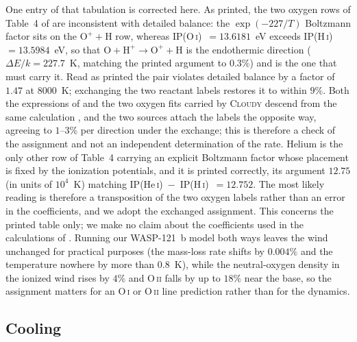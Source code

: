 \documentclass[twocolumn]{aastex702}
\begin{document}
One entry of that tabulation is corrected here. As printed, the two oxygen rows of
Table~4 of \citet{Huang2023} are inconsistent with detailed balance: the
$\exp(-227/T)$ Boltzmann factor sits on the $\mathrm{O^+}+\mathrm{H}$ row, whereas
IP(\mbox{O\,\textsc{i}})~$=13.6181$~eV exceeds IP(\mbox{H\,\textsc{i}})~$=13.5984$~eV,
so that $\mathrm{O}+\mathrm{H^+}\rightarrow\mathrm{O^+}+\mathrm{H}$ is the endothermic
direction ($\Delta E/k = 227.7$~K, matching the printed argument to $0.3\%$) and is the
one that must carry it. Read as printed the pair violates detailed balance by a factor of
$1.47$ at $8000$~K; exchanging the two reactant labels restores it to within $9\%$. Both
the expressions of \citet{Huang2023} and the two oxygen fits carried by \textsc{Cloudy}
\citep{Cloudy2025} descend from the same calculation \citep{Stancil1999}, and the two
sources attach the labels the opposite way, agreeing to $1$--$3\%$ per direction under the
exchange; this is therefore a check of the assignment and not an independent
determination of the rate. Helium is the only other row of Table~4 carrying an explicit
Boltzmann factor whose placement is fixed by the ionization potentials, and it is printed
correctly, its argument $12.75$ (in units of $10^{4}$~K) matching
IP(\mbox{He\,\textsc{i}})~$-$~IP(\mbox{H\,\textsc{i}})~$=12.752$. The most likely reading
is therefore a transposition of the two oxygen labels rather than an error in the
coefficients, and we adopt the exchanged assignment. This concerns the printed table
only; we make no claim about the coefficients used in the calculations of
\citet{Huang2023}. Running our WASP-121~b model both ways leaves the wind unchanged for
practical purposes (the mass-loss rate shifts by $0.004\%$ and the temperature nowhere
by more than $0.8$~K), while the neutral-oxygen density in the ionized wind rises by
$4\%$ and \mbox{O\,\textsc{ii}} falls by up to $18\%$ near the base, so the assignment
matters for an \mbox{O\,\textsc{i}} or \mbox{O\,\textsc{ii}} line prediction rather than
for the dynamics.

\subsection{Cooling}
\label{sec:cooling}
\end{document}
